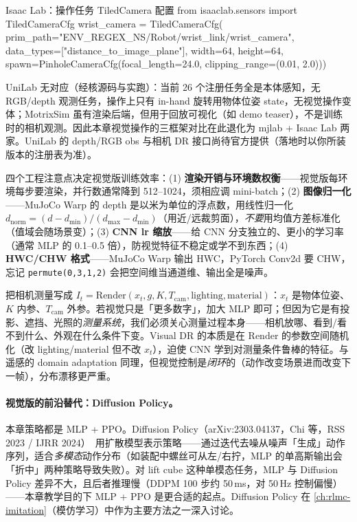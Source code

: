 \begin{codebox}[Python]{Isaac Lab：操作任务 TiledCamera 配置}
from isaaclab.sensors import TiledCameraCfg
wrist_camera = TiledCameraCfg(
    prim_path="{ENV_REGEX_NS}/Robot/wrist_link/wrist_camera",
    data_types=["distance_to_image_plane"], width=64, height=64,
    spawn=PinholeCameraCfg(focal_length=24.0, clipping_range=(0.01, 2.0)))
\end{codebox}

UniLab 无对应（经核源码与实跑）：当前 26 个注册任务全是本体感知，无 RGB/depth 观测任务，操作上只有 in-hand 旋转用物体位姿 state，无视觉操作变体；MotrixSim 虽有渲染后端，但用于回放可视化（如 demo teaser），不是训练时的相机观测。因此本章视觉操作的三框架对比在此退化为 mjlab + Isaac Lab 两家。UniLab 的 depth/RGB obs 与相机 DR 接口尚待官方提供（落地时以你所装版本的注册表为准）。

四个工程注意点决定视觉版训练效率：(1) \textbf{渲染开销与环境数权衡}——视觉版每环境每步要渲染，并行数通常降到 512--1024，须相应调 mini-batch；(2) \textbf{图像归一化}——MuJoCo Warp 的 depth 是以米为单位的浮点数，用线性归一化 $d_{\text{norm}}=(d-d_{\min})/(d_{\max}-d_{\min})$（用近/远裁剪面），\emph{不要}用均值方差标准化（值域会随场景变）；(3) \textbf{CNN lr 缩放}——给 CNN 分支独立的、更小的学习率（通常 MLP 的 0.1--0.5 倍），防视觉特征不稳定或学不到东西；(4) \textbf{HWC/CHW 格式}——MuJoCo Warp 输出 HWC，PyTorch Conv2d 要 CHW，忘记 \verb|permute(0,3,1,2)| 会把空间维当通道维、输出全是噪声。

\begin{insight}\label{ins:rlmc-manip-measure}
把相机测量写成 $I_t=\mathrm{Render}(x_t,g,K,T_{\text{cam}},\text{lighting},\text{material})$：$x_t$ 是物体位姿、$K$ 内参、$T_{\text{cam}}$ 外参。若视觉只是「更多数字」，加大 MLP 即可；但因为它是有投影、遮挡、光照的\emph{测量系统}，我们必须关心测量过程本身——相机放哪、看到/看不到什么、外观在什么条件下变。Visual DR 的本质是在 $\mathrm{Render}$ 的参数空间随机化（改 lighting/material 但不改 $x_t$），迫使 CNN 学到对测量条件鲁棒的特征。与遥感的 domain adaptation 同理，但视觉控制是\emph{闭环}的（动作改变场景进而改变下一帧），分布漂移更严重。
\end{insight}

\paragraph{视觉版的前沿替代：Diffusion Policy。}本章策略都是 MLP + PPO。Diffusion Policy（arXiv:2303.04137，Chi 等，RSS 2023 / IJRR 2024）\,\cite{chi2023diffusion} 用扩散模型表示策略——通过迭代去噪从噪声「生成」动作序列，适合\emph{多模态}动作分布（如装配中螺丝可从左/右拧，MLP 的单高斯输出会「折中」两种策略导致失败）。对 lift cube 这种单模态任务，MLP 与 Diffusion Policy 差异不大，且后者推理慢（DDPM 100 步约 50\,ms，对 50\,Hz 控制偏慢）——本章教学目的下 MLP + PPO 是更合适的起点。Diffusion Policy 在 \cref{ch:rlmc-imitation}（模仿学习）中作为主要方法之一深入讨论。

